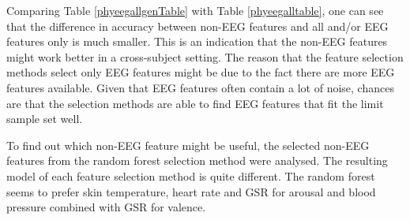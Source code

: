 Comparing Table \ref{phyeegallgenTable} with Table \ref{phyeegalltable}, one can see that the difference in accuracy between non-EEG features and all and/or EEG features only is much smaller. This is an indication that the non-EEG features might work better in a cross-subject setting. The reason that the feature selection methods select only EEG features might be due to the fact there are more EEG features available. Given that EEG features often contain a lot of noise, chances are that the selection methods are able to find EEG features that fit the limit sample set well. 

\npar

To find out which non-EEG feature might be useful, the selected non-EEG features from the random forest selection method were analysed. The resulting model of each feature selection method is quite different. The random forest seems to prefer skin temperature, heart rate and GSR for arousal and blood pressure combined with GSR for valence.

\clearpage

